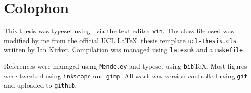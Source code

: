 \chapter{Colophon}

This thesis was typeset using \XeLaTeX\ via the text editor \texttt{vim}.
The class file used was modified by me from the official UCL \LaTeX\ thesis template 
\texttt{ucl-thesis.cls} written by Ian Kirker. Compilation was managed using
\texttt{latexmk} and a \texttt{makefile}.

References were managed using \texttt{Mendeley} and typeset using \texttt{bib}{\TeX}.
Most figures were tweaked using \texttt{inkscape} and \texttt{gimp}.
All work was version controlled using \texttt{git} and uploaded to \texttt{github}. 


